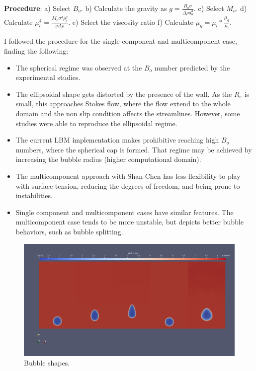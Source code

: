 \documentclass[12pt]{article}
\begin{document}
	\textbf{Procedure}: a) Select $B_o$. b) Calculate the gravity as $g = \frac{B_o \sigma}{\Delta \rho d_b^2}$. c) Select $M_o$. d) Calculate $\mu_l^4 = \frac{M_o \sigma^3 \rho_l^2}{g \Delta \rho }$. e) Select the viscosity ratio f) Calculate $\mu_g = \mu_l * \frac{\mu_g}{\mu_l}$.
	
	I followed the procedure for the single-component and multicomponent case, finding the following:
	\begin{itemize}
		\item The spherical regime was observed at the $B_o$ number predicted by the experimental studies.
		\item The ellipsoidal shape gets distorted by the presence of the wall. As the $R_e$ is small, this approaches Stokes flow, where the flow extend to the whole domain and the non slip condition affects the streamlines. However, some studies were able to reproduce the ellipsoidal regime. 
		\item The current LBM implementation makes prohibitive reaching high $B_o$ numbers, where the spherical cap is formed. That regime may be achieved by increasing the bubble radius (higher computational domain).
		\item The multicomponent approach with Shan-Chen has less flexibility to play with surface tension, reducing the degrees of freedom, and being prone to instabilities.
		\item Single component and multicomponent cases have similar features. The multicomponent case tends to be more unstable, but depicts better bubble behaviors, such as bubble splitting.
	\end{itemize}
	
	\begin{figure}[h]
		\centering
		\includegraphics[scale=0.2]{pics/risingCompDen.png}
		\caption{Bubble shapes.}
	\end{figure}
\end{document}
